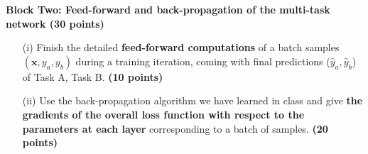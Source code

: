 \textbf{Block Two: Feed-forward and back-propagation of the multi-task network (30 points)}
\begin{enumerate}
    \item[(i)] Finish the detailed \textbf{feed-forward computations} of a batch samples $(\bm{x}, y_a, y_b)$ 
    during a training iteration, coming with ﬁnal predictions ($\hat{y}_a , \hat{y}_b$) of Task A, Task B. 
    \textbf{(10 points)}
    \item[(ii)] Use the back-propagation algorithm we have learned in class and give \textbf{the gradients 
    of the overall loss function with respect to the parameters at each layer} corresponding to 
    a batch of samples. \textbf{(20 points)}
\end{enumerate}